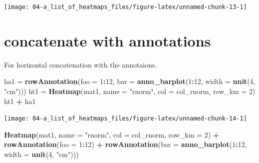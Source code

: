 \documentclass[]{book}
\newenvironment{Shaded}{\begin{snugshade}}{\end{snugshade}}
\newcommand{\KeywordTok}[1]{\textcolor[rgb]{0.13,0.29,0.53}{\textbf{#1}}}
\newcommand{\DataTypeTok}[1]{\textcolor[rgb]{0.13,0.29,0.53}{#1}}
\newcommand{\DecValTok}[1]{\textcolor[rgb]{0.00,0.00,0.81}{#1}}
\newcommand{\StringTok}[1]{\textcolor[rgb]{0.31,0.60,0.02}{#1}}
\newcommand{\OperatorTok}[1]{\textcolor[rgb]{0.81,0.36,0.00}{\textbf{#1}}}
\newcommand{\NormalTok}[1]{#1}
\theoremstyle{definition}
\theoremstyle{definition}
\theoremstyle{definition}
\theoremstyle{remark}
\begin{document}
\begin{center}\texttt{[image: 04-a\_list\_of\_heatmaps\_files/figure-latex/unnamed-chunk-13-1]} \end{center}

\section{concatenate with
annotations}\label{concatenate-with-annotations}

For horizontal concatenation with the annotaions.

\begin{Shaded}
\begin{Highlighting}[]
\NormalTok{ha1 =}\StringTok{ }\KeywordTok{rowAnnotation}\NormalTok{(}\DataTypeTok{foo =} \DecValTok{1}\OperatorTok{:}\DecValTok{12}\NormalTok{, }\DataTypeTok{bar =} \KeywordTok{anno_barplot}\NormalTok{(}\DecValTok{1}\OperatorTok{:}\DecValTok{12}\NormalTok{, }\DataTypeTok{width =} \KeywordTok{unit}\NormalTok{(}\DecValTok{4}\NormalTok{, }\StringTok{"cm"}\NormalTok{)))}
\NormalTok{ht1 =}\StringTok{ }\KeywordTok{Heatmap}\NormalTok{(mat1, }\DataTypeTok{name =} \StringTok{"rnorm"}\NormalTok{, }\DataTypeTok{col =}\NormalTok{ col_rnorm, }\DataTypeTok{row_km =} \DecValTok{2}\NormalTok{)}
\NormalTok{ht1 }\OperatorTok{+}\StringTok{ }\NormalTok{ha1}
\end{Highlighting}
\end{Shaded}

\begin{center}\texttt{[image: 04-a\_list\_of\_heatmaps\_files/figure-latex/unnamed-chunk-14-1]} \end{center}

\begin{Shaded}
\begin{Highlighting}[]
\KeywordTok{Heatmap}\NormalTok{(mat1, }\DataTypeTok{name =} \StringTok{"rnorm"}\NormalTok{, }\DataTypeTok{col =}\NormalTok{ col_rnorm, }\DataTypeTok{row_km =} \DecValTok{2}\NormalTok{) }\OperatorTok{+}\StringTok{ }
\StringTok{    }\KeywordTok{rowAnnotation}\NormalTok{(}\DataTypeTok{foo =} \DecValTok{1}\OperatorTok{:}\DecValTok{12}\NormalTok{) }\OperatorTok{+}
\StringTok{    }\KeywordTok{rowAnnotation}\NormalTok{(}\DataTypeTok{bar =} \KeywordTok{anno_barplot}\NormalTok{(}\DecValTok{1}\OperatorTok{:}\DecValTok{12}\NormalTok{, }\DataTypeTok{width =} \KeywordTok{unit}\NormalTok{(}\DecValTok{4}\NormalTok{, }\StringTok{"cm"}\NormalTok{)))}
\end{Highlighting}
\end{Shaded}
\end{document}
